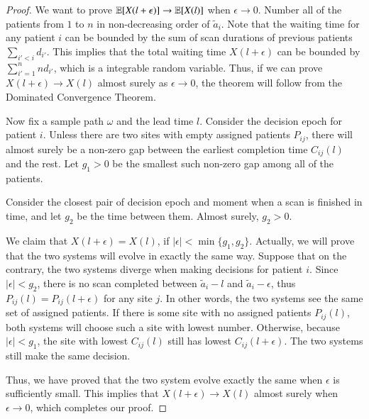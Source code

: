 \begin{proof}
We want to prove $\operatorname*{\mathbb{E}}[X(l+\epsilon)] \rightarrow \operatorname*{\mathbb{E}}[X(l)]$ when
$\epsilon \rightarrow 0$.
Number all of the patients from $1$ to $n$ in non-decreasing order of $\tilde a_i$.
Note that the waiting time for any patient $i$ can be bounded
by the sum of scan durations of previous patients $\sum_{i' < i} d_{i'}$.
This implies that the total waiting time $X(l+\epsilon)$
can be bounded by $\sum_{i'=1}^n nd_{i'}$, which is
a integrable random variable. Thus, if we can prove
$X(l+\epsilon) \rightarrow X(l)$ almost surely
as $\epsilon \rightarrow 0$, the theorem will follow from
the Dominated Convergence Theorem.

Now fix a sample path $\omega$ and the lead time $l$.
Consider the decision epoch for patient $i$.
Unless there are two sites with empty assigned patients $P_{ij}$, there will almost surely
be a non-zero gap between the earliest completion time $C_{ij}(l)$ and the rest.
Let $g_1>0$ be the smallest such non-zero gap among all of the patients.

Consider the closest pair of decision epoch and moment when a scan
is finished in time, and let $g_2$ be the time between them.
Almost surely, $g_2 > 0$.

We claim that $X(l+\epsilon)=X(l)$, if $|\epsilon| < \min\{g_1, g_2\}$.
Actually, we will prove that the two systems will evolve in exactly the same way.
Suppose that on the contrary, the two systems diverge when
making decisions for patient $i$. Since $|\epsilon| < g_2$,
there is no scan completed between $\tilde a_i -l$ and
$\tilde a_i-\epsilon$, thus $P_{ij}(l) = P_{ij}(l+\epsilon)$ for any site $j$.
In other words, the two systems see the same set of assigned patients.
If there is some site with no assigned patients $P_{ij}(l)$,
both systems will choose such a site with lowest number.
Otherwise, because $|\epsilon| < g_1$, the site with lowest $C_{ij}(l)$
still has lowest $C_{ij}(l+\epsilon)$. The two systems still
make the same decision.

Thus, we have proved that the two system evolve
exactly the same when $\epsilon$ is sufficiently small.
This implies that $X(l+\epsilon) \rightarrow X(l)$ almost surely
when $\epsilon \rightarrow 0$, which completes our proof.
\end{proof}
